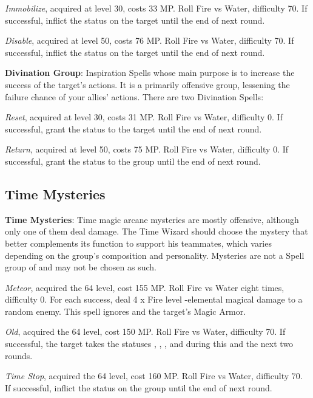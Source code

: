 \begin{multicols}{2}
    \textit{Immobilize}, acquired at level 30, costs 33 MP. Roll Fire vs Water, difficulty 70. If successful, inflict the  status on the target until the end of next round.
    
    \textit{Disable}, acquired at level 50, costs 76 MP. Roll Fire vs Water, difficulty 70. If successful, inflict the  status on the target until the end of next round.
    
    \textbf{Divination Group}: Inspiration Spells whose main purpose is to increase the success of the target’s actions. It is a primarily offensive group, lessening the failure chance of your allies’ actions. There are two Divination Spells:
    
    \textit{Reset}, acquired at level 30, costs 31 MP. Roll Fire vs Water, difficulty 0. If successful, grant the  status to the target until the end of next round.
    
    \textit{Return}, acquired at level 50, costs 75 MP. Roll Fire vs Water, difficulty 0. If successful, grant the  status to the group until the end of next round.
    
    \subsection{Time Mysteries}

    \textbf{Time Mysteries}: Time magic arcane mysteries are mostly offensive, although only one of them deal damage. The Time Wizard should choose the mystery that better complements its function to support his teammates, which varies depending on the group’s composition and personality. Mysteries are not a Spell group of and may not be chosen as such.
    
    \textit{Meteor}, acquired the 64 level, cost 155 MP. Roll Fire vs Water eight times, difficulty 0. For each success, deal 4 x Fire level -elemental magical damage to a random enemy. This spell ignores  and the target’s Magic Armor.
    
    \textit{Old}, acquired the 64 level, cost 150 MP. Roll Fire vs Water, difficulty 70. If successful, the target takes the statuses , , ,  and  during this and the next two rounds.
    
    \textit{Time Stop}, acquired the 64 level, cost 160 MP. Roll Fire vs Water, difficulty 70. If successful, inflict the  status on the group until the end of next round.

\end{multicols}

